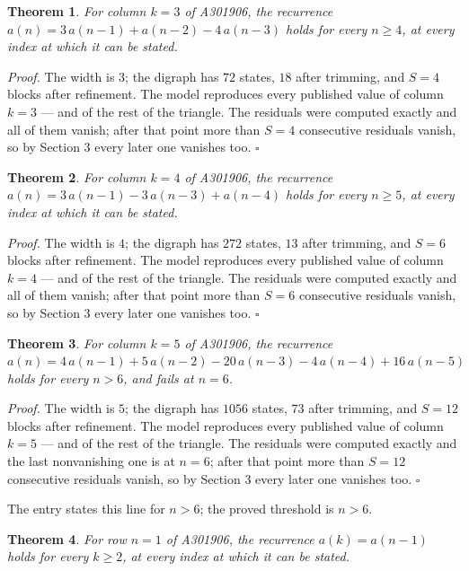\documentclass[11pt]{article}
\newtheorem{theorem}{Theorem}
\theoremstyle{definition}
\begin{document}
\begin{theorem} For column $k = 3$ of A301906, the recurrence $a(n) = 3\,a(n-1) + a(n-2) - 4\,a(n-3)$ holds for every $n \ge 4$, at every index at which it can be stated.\end{theorem}

{\itshape Proof.} The width is $3$; the digraph has $72$ states, $18$ after trimming, and $S = 4$ blocks after refinement. The model reproduces every published value of column $k = 3$ --- and of the rest of the triangle. The residuals were computed exactly and all of them vanish; after that point more than $S = 4$ consecutive residuals vanish, so by Section 3 every later one vanishes too. $\square$

\begin{theorem} For column $k = 4$ of A301906, the recurrence $a(n) = 3\,a(n-1) - 3\,a(n-3) + a(n-4)$ holds for every $n \ge 5$, at every index at which it can be stated.\end{theorem}

{\itshape Proof.} The width is $4$; the digraph has $272$ states, $13$ after trimming, and $S = 6$ blocks after refinement. The model reproduces every published value of column $k = 4$ --- and of the rest of the triangle. The residuals were computed exactly and all of them vanish; after that point more than $S = 6$ consecutive residuals vanish, so by Section 3 every later one vanishes too. $\square$

\begin{theorem} For column $k = 5$ of A301906, the recurrence $a(n) = 4\,a(n-1) + 5\,a(n-2) - 20\,a(n-3) - 4\,a(n-4) + 16\,a(n-5)$ holds for every $n > 6$, and fails at $n = 6$.\end{theorem}

{\itshape Proof.} The width is $5$; the digraph has $1056$ states, $73$ after trimming, and $S = 12$ blocks after refinement. The model reproduces every published value of column $k = 5$ --- and of the rest of the triangle. The residuals were computed exactly and the last nonvanishing one is at $n = 6$; after that point more than $S = 12$ consecutive residuals vanish, so by Section 3 every later one vanishes too. $\square$

The entry states this line for $n > 6$; the proved threshold is $n > 6$.

\begin{theorem} For row $n = 1$ of A301906, the recurrence $a(k) = a(n-1)$ holds for every $k \ge 2$, at every index at which it can be stated.\end{theorem}
\end{document}
